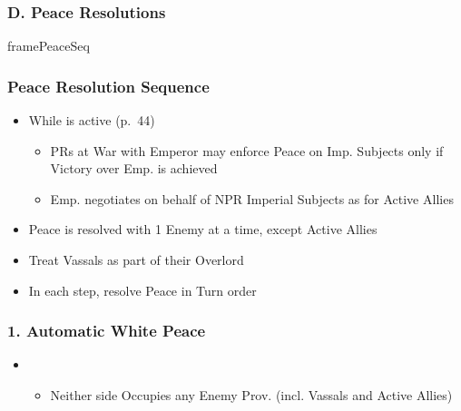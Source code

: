 \documentclass[10pt]{article}
\begin{document}
\subsubsection*{D. Peace Resolutions}%
\begin{dynamiccontents*}{framePeaceSeq}
	\begin{multicols}{2}
		\subsubsection*{Peace Resolution Sequence }
		\begin{itemize}
			\item While  is active (p.~44)
			\begin{itemize}
				\item PRs at War with Emperor may enforce Peace on Imp. Subjects only if Victory over Emp. is achieved
				\item Emp. negotiates on behalf of NPR Imperial Subjects as for Active Allies
			\end{itemize}
			\item Peace is resolved with 1 Enemy at a time, except Active Allies
			\item Treat Vassals as part of their Overlord
			\item In each step, resolve Peace in Turn order
		\end{itemize}

		\subsubsection*{1. Automatic White Peace}
		\begin{itemize}
			\item {}
			\begin{itemize}
				\item Neither side Occupies any Enemy Prov. (incl. Vassals and Active Allies)
			\end{itemize}
		\end{itemize}


\end{multicols}
\end{dynamiccontents*}
\end{document}

